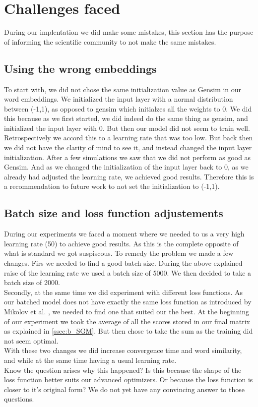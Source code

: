 \section{Challenges faced}
During our implentation we did make some mistakes, this section has the purpose of informing the scientific community to not make the same mistakes. 
\subsection{Using the wrong embeddings}
To start with, we did not chose the same initialization value as Gensim in our word embeddings. We initialized the input layer with a normal distribution between (-1,1), as opposed to gensim which initialzes all the weights to 0. We did this because as we first started, we did indeed do the same thing as gensim, and initialized the input layer with 0. But then our model did not seem to train well. Retrospectively we accord this to a learning rate that was too low. But back  then we did not have the clarity of mind to see it, and instead changed the input layer initialization. After a few simulations we saw that we did not perform as good as Gensim. And as we changed the initialization of the input layer back to 0, as we already had adjusted the learning rate, we achieved good results. Therefore this is a recommendation to future work to not set the initialization to (-1,1).

\subsection{Batch size and loss function adjustements}\label{ssec:bs_lf}
During our experiments we faced a moment where we needed to us a very high learning rate (50) to achieve good results. As this is the complete opposite of what is standard we got suspiscous. To remedy the problem we made a few changes. 
Firs we needed to find a good batch size. During the above explained raise of the learning rate we used a batch size of 5000. We then decided to take a batch size of 2000.\\
 Secondly, at the same time we did experiment with different loss functions. As our batched model does not have exactly the same loss function as introduced by Mikolov et al. \cite{mikolov}, we needed to find one that suited  our the best. At the beginning of our experiment we took the average of all the scores stored in our final matrix as explained in \ref{ssec:b_SGM}. But then chose to take the sum as the training did not seem optimal.\\ 
 With these two changes we did increase convergence time and word similarity, and while at the same time having a usual learning rate. \\
 Know the question arises why this happened? Is this because the shape of the loss function better suits our advanced optimizers. Or because the loss function is closer to it's original form? We do not yet have any convincing answer to those questions.

